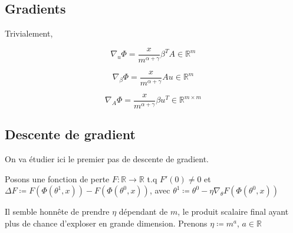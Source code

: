 \documentclass[a4paper, 11pt, french]{article}
\begin{document}
	\subsection*{Gradients}
	
	Trivialement,
	
	\[ \nabla_u \Phi = \frac{x}{m^{\alpha + \gamma}} \beta^T A \in \mathbb{R}^m\]
	
	\[ \nabla_{\beta} \Phi = \frac{x}{m^{\alpha + \gamma}} A u \in \mathbb{R}^m\]
	
	\[ \nabla_A \Phi = \frac{x}{m^{\alpha + \gamma}} \beta u^T \in \mathbb{R}^{m \times m}\]
	
	\subsection*{Descente de gradient}
	
	On va étudier ici le premier pas de descente de gradient.
	
	Posons une fonction de perte $F : \mathbb{R} \rightarrow \mathbb{R}$ t.q $F'(0) \neq 0$ et 
	$\Delta F \coloneqq F(\Phi(\theta^1, x)) - F(\Phi(\theta^0, x))$, avec 
	$\theta^1 \coloneqq \theta^0 - \eta \nabla_{\theta} F(\Phi(\theta^0, x))$

	Il semble honnête de prendre $\eta$ dépendant de $m$, le produit scalaire final ayant plus de chance d'exploser en grande dimension. Prenons $\eta \coloneqq m^a$, $a \in \mathbb{R}$ \\
	
\end{document}
